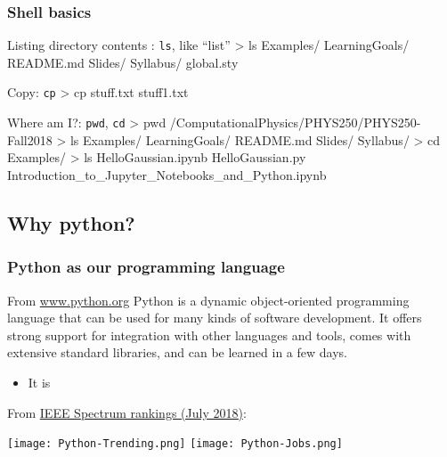 \documentclass[hyperref={colorlinks=true}]{beamer}
\begin{document}

\begin{frame}[fragile]
  \frametitle{Shell basics}
  
  \begin{ucbashblock}{Listing directory contents : \texttt{ls}, like ``list''}
> ls
Examples/ LearningGoals/ README.md Slides/ 
Syllabus/ global.sty
  \end{ucbashblock}
  
  \begin{ucbashblock}{Copy: \texttt{cp}}
> cp stuff.txt stuff1.txt
  \end{ucbashblock}
  
  \begin{ucbashblock}{Where am I?: \texttt{pwd}, \texttt{cd}}
> pwd
/ComputationalPhysics/PHYS250/PHYS250-Fall2018
> ls
Examples/ LearningGoals/ README.md Slides/ Syllabus/
> cd Examples/
> ls
HelloGaussian.ipynb
HelloGaussian.py
Introduction_to_Jupyter_Notebooks_and_Python.ipynb
  \end{ucbashblock}  
\end{frame}


\subsection[Why python?]{Why python?}

\begin{frame}%
  \frametitle{Python as our programming language}
    
  \begin{ucblock}{From \url{www.python.org}}
    Python is a dynamic object-oriented programming language that can be used for many kinds of software development. It offers strong support for integration with other languages and tools, comes with extensive standard libraries, and can be learned in a few days.
  \end{ucblock}
  
  
  \begin{itemize}
    \item It is 
  \end{itemize}
    
  From \href{https://spectrum.ieee.org/static/interactive-the-top-programming-languages-2018}{IEEE Spectrum rankings (July 2018)}:

  \begin{center}
    \texttt{[image: Python-Trending.png]}
    \texttt{[image: Python-Jobs.png]}
  \end{center}  
    
\end{frame}
\end{document}
